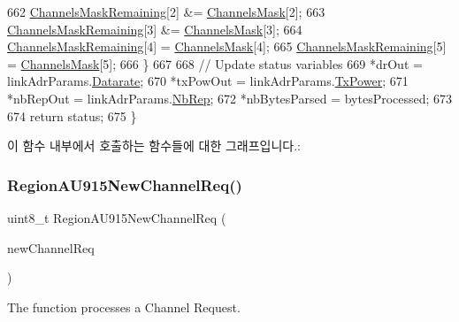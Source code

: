\begin{DoxyCode}
662         \mbox{\hyperlink{_region_a_u915_8c_a567333cec639a004655cc1717e9d0928}{ChannelsMaskRemaining}}[2] &= \mbox{\hyperlink{_region_a_u915_8c_a2188957b5ca6af8092154d7ccbfa5757}{ChannelsMask}}[2];
663         \mbox{\hyperlink{_region_a_u915_8c_a567333cec639a004655cc1717e9d0928}{ChannelsMaskRemaining}}[3] &= \mbox{\hyperlink{_region_a_u915_8c_a2188957b5ca6af8092154d7ccbfa5757}{ChannelsMask}}[3];
664         \mbox{\hyperlink{_region_a_u915_8c_a567333cec639a004655cc1717e9d0928}{ChannelsMaskRemaining}}[4] = \mbox{\hyperlink{_region_a_u915_8c_a2188957b5ca6af8092154d7ccbfa5757}{ChannelsMask}}[4];
665         \mbox{\hyperlink{_region_a_u915_8c_a567333cec639a004655cc1717e9d0928}{ChannelsMaskRemaining}}[5] = \mbox{\hyperlink{_region_a_u915_8c_a2188957b5ca6af8092154d7ccbfa5757}{ChannelsMask}}[5];
666     \}
667 
668     \textcolor{comment}{// Update status variables}
669     *drOut = linkAdrParams.\mbox{\hyperlink{structs_region_common_link_adr_params_ae2f6080f3aa0e9485c55513ca56bb24d}{Datarate}};
670     *txPowOut = linkAdrParams.\mbox{\hyperlink{structs_region_common_link_adr_params_a037b4f849fa8ed4aa1d3c58aef2b28ec}{TxPower}};
671     *nbRepOut = linkAdrParams.\mbox{\hyperlink{structs_region_common_link_adr_params_a3b99538671d86dbfe2f6754ce6f9577a}{NbRep}};
672     *nbBytesParsed = bytesProcessed;
673 
674     \textcolor{keywordflow}{return} status;
675 \}
\end{DoxyCode}
이 함수 내부에서 호출하는 함수들에 대한 그래프입니다.\+:
\mbox{\label{group___r_e_g_i_o_n_a_u915_gab50eb32c1a156ee9629976c7bf29967c}} 
\subsubsection{\texorpdfstring{Region\+A\+U915\+New\+Channel\+Req()}{RegionAU915NewChannelReq()}}
{\footnotesize\ttfamily uint8\+\_\+t Region\+A\+U915\+New\+Channel\+Req (\begin{DoxyParamCaption}\item[{\mbox{\hyperlink{group___r_e_g_i_o_n_gae2abcdb6dbb843c9faf5fd3009eca9d6}{New\+Channel\+Req\+Params\+\_\+t}} $\ast$}]{new\+Channel\+Req }\end{DoxyParamCaption})}



The function processes a Channel Request. 


